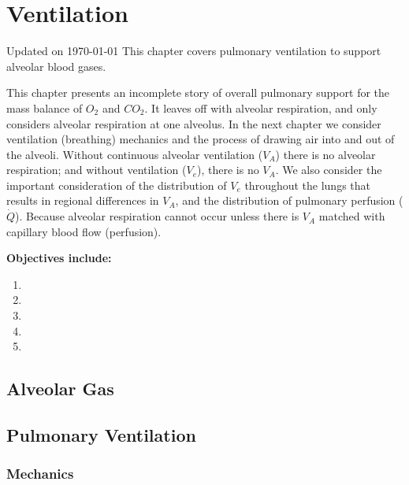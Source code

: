 \chapter{Ventilation}\label{chp:alveolar_oxygen}
Updated on \today
\minitoc
This chapter covers pulmonary ventilation to support alveolar blood gases.

This chapter presents an incomplete story of overall pulmonary support for the mass balance of $O_2$ and $CO_2$. It leaves off with alveolar respiration, and only considers alveolar respiration at one alveolus. In the next chapter we consider ventilation (breathing) mechanics and the process of drawing air into and out of the alveoli. Without continuous alveolar ventilation ($V_A$) there is no alveolar respiration; and without ventilation ($V_e$), there is no $V_A$. We also consider the important consideration of the distribution of $V_e$ throughout the lungs that results in regional differences in $V_A$, and the distribution of pulmonary perfusion ($\dot{Q}$). Because alveolar respiration cannot occur unless there is $V_A$ matched with capillary blood flow (perfusion). 



\vspace{5mm}

\textbf{Objectives include:}
\begin{enumerate}
    \item
    \item
    \item
    \item
    \item
\end{enumerate}

\section{Alveolar Gas}

\section{Pulmonary Ventilation}

\subsection{Mechanics}

